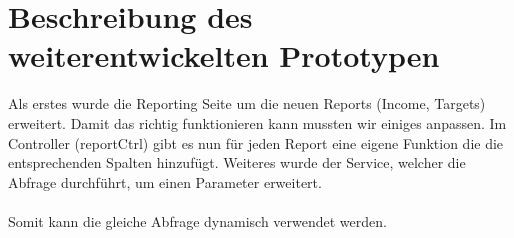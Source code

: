 \documentclass[runningheads,a4paper]{llncs}
\begin{document}
\section{Beschreibung des weiterentwickelten Prototypen}
Als erstes wurde die Reporting Seite um die neuen Reports (Income, Targets) erweitert. Damit das richtig funktionieren kann mussten wir einiges anpassen. Im Controller (reportCtrl) gibt es nun für jeden Report eine eigene Funktion die die entsprechenden Spalten hinzufügt. Weiteres wurde der Service, welcher die Abfrage durchführt, um einen Parameter erweitert.\\\\ Somit kann die gleiche Abfrage dynamisch verwendet werden. \\

\begin{figure}
\centering
{}
\hfill
{}
\hfill
{}
\end{figure}
\end{document}
